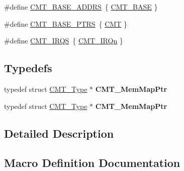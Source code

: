 \begin{DoxyCompactItemize}
\item 
\#define \hyperlink{group__CMT__Peripheral__Access__Layer_gad5658ec1717cf6b1a031581da622b98c}{C\+M\+T\+\_\+\+B\+A\+S\+E\+\_\+\+A\+D\+D\+RS}~\{ \hyperlink{group__CMT__Peripheral__Access__Layer_ga53e160517651b4460f52bf43fe1e197a}{C\+M\+T\+\_\+\+B\+A\+SE} \}
\item 
\#define \hyperlink{group__CMT__Peripheral__Access__Layer_gad58e606f11af35440c1b77ff05b55874}{C\+M\+T\+\_\+\+B\+A\+S\+E\+\_\+\+P\+T\+RS}~\{ \hyperlink{group__CMT__Peripheral__Access__Layer_ga20a0cd761e563c3a1a75267b661ac5b8}{C\+MT} \}
\item 
\#define \hyperlink{group__CMT__Peripheral__Access__Layer_ga6ead37abf997ee35670a9464ae7858bb}{C\+M\+T\+\_\+\+I\+R\+QS}~\{ \hyperlink{group__Interrupt__vector__numbers_gga666eb0caeb12ec0e281415592ae89083a6850b1b7108ace2b7369a0f07a31db57}{C\+M\+T\+\_\+\+I\+R\+Qn} \}
\end{DoxyCompactItemize}
\subsection*{Typedefs}
\begin{DoxyCompactItemize}
\item 
typedef struct \hyperlink{structCMT__Type}{C\+M\+T\+\_\+\+Type} $\ast$ {\bfseries C\+M\+T\+\_\+\+Mem\+Map\+Ptr}\hypertarget{group__CMT__Peripheral__Access__Layer_ga661d300631186b3038ab08bea7292934}{}\label{group__CMT__Peripheral__Access__Layer_ga661d300631186b3038ab08bea7292934}

\item 
typedef struct \hyperlink{structCMT__Type}{C\+M\+T\+\_\+\+Type} $\ast$ {\bfseries C\+M\+T\+\_\+\+Mem\+Map\+Ptr}\hypertarget{group__CMT__Peripheral__Access__Layer_ga661d300631186b3038ab08bea7292934}{}\label{group__CMT__Peripheral__Access__Layer_ga661d300631186b3038ab08bea7292934}

\end{DoxyCompactItemize}


\subsection{Detailed Description}


\subsection{Macro Definition Documentation}
